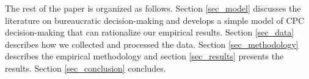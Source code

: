 The rest of the paper is organized as follows. Section \ref{sec_model} discusses the literature on bureaucratic decision-making and develops a simple model of CPC decision-making that can rationalize our empirical results. Section \ref{sec_data} describes how we collected and processed the data. Section \ref{sec_methodology} describes the empirical methodology and section \ref{sec_results} presents the results. Section \ref{sec_conclusion} concludes.



